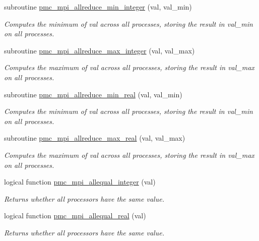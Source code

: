 \begin{DoxyCompactItemize}
subroutine \mbox{\hyperlink{namespacepmc__mpi_adf0ef14e00e2b7cf522926e5d6b757cb}{pmc\+\_\+mpi\+\_\+allreduce\+\_\+min\+\_\+integer}} (val, val\+\_\+min)
\begin{DoxyCompactList}\small\item\em Computes the minimum of val across all processes, storing the result in val\+\_\+min on all processes. \end{DoxyCompactList}\item 
subroutine \mbox{\hyperlink{namespacepmc__mpi_a21063691a7e6791c71a89263c18bd7d4}{pmc\+\_\+mpi\+\_\+allreduce\+\_\+max\+\_\+integer}} (val, val\+\_\+max)
\begin{DoxyCompactList}\small\item\em Computes the maximum of val across all processes, storing the result in val\+\_\+max on all processes. \end{DoxyCompactList}\item 
subroutine \mbox{\hyperlink{namespacepmc__mpi_acd75456e29bd2c7a400b6c050f8e9c04}{pmc\+\_\+mpi\+\_\+allreduce\+\_\+min\+\_\+real}} (val, val\+\_\+min)
\begin{DoxyCompactList}\small\item\em Computes the minimum of val across all processes, storing the result in val\+\_\+min on all processes. \end{DoxyCompactList}\item 
subroutine \mbox{\hyperlink{namespacepmc__mpi_a56764a88a85a09a1c97a2ae512415633}{pmc\+\_\+mpi\+\_\+allreduce\+\_\+max\+\_\+real}} (val, val\+\_\+max)
\begin{DoxyCompactList}\small\item\em Computes the maximum of val across all processes, storing the result in val\+\_\+max on all processes. \end{DoxyCompactList}\item 
logical function \mbox{\hyperlink{namespacepmc__mpi_aa5850392ee2226b1d9b0387849d33b42}{pmc\+\_\+mpi\+\_\+allequal\+\_\+integer}} (val)
\begin{DoxyCompactList}\small\item\em Returns whether all processors have the same value. \end{DoxyCompactList}\item 
logical function \mbox{\hyperlink{namespacepmc__mpi_a92d80c63cf20c10ce32e2e8e5cb81c18}{pmc\+\_\+mpi\+\_\+allequal\+\_\+real}} (val)
\begin{DoxyCompactList}\small\item\em Returns whether all processors have the same value. \end{DoxyCompactList}\item 

\end{DoxyCompactItemize}
